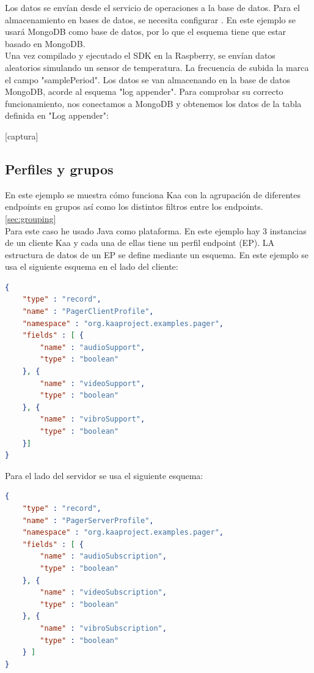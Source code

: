\documentclass[12pt, twoside]{book}
\newcommand{\MYhref}[3][blue]{\href{#2}{\color{#1}{#3}}}
\begin{document}
Los datos se envían desde el  servicio de operaciones a  la base de datos. Para el almacenamiento en bases de datos, se necesita configurar \MYhref{http://kaaproject.github.io/kaa/docs/v0.10.0/Programming-guide/Key-platform-features/Data-collection/MongoDB-log-appender/}{log appender}.  En este ejemplo se usará MongoDB como base de datos, por lo que el esquema  tiene que estar basado en MongoDB. \\

Una vez compilado y ejecutado el SDK en la Raspberry, se envían datos aleatorios simulando un sensor de temperatura. La frecuencia de subida la marca el campo "samplePeriod". Los datos se van almacenando en la base de datos MongoDB, acorde al esquema "log appender". 
Para comprobar su correcto funcionamiento, nos conectamos a MongoDB y obtenemos los datos de la tabla definida en "Log appender":

[captura]
\subsection{Perfiles y grupos}
En este ejemplo se muestra cómo funciona Kaa con la agrupación de diferentes endpoints en grupos así como los distintos filtros entre los endpoints. \ref{sec:grouping} \\

Para este caso he usado Java como plataforma. En este ejemplo hay 3 instancias de un cliente Kaa y cada una de ellas tiene un perfil endpoint (EP). LA estructura de datos de un EP se define mediante un esquema. En este ejemplo se usa el siguiente esquema en el lado del cliente:
\begin{lstlisting}[language=json]
{
 	"type" : "record",
 	"name" : "PagerClientProfile",
	"namespace" : "org.kaaproject.examples.pager",
	"fields" : [ {
		"name" : "audioSupport",
		"type" : "boolean"
  	}, {
		"name" : "videoSupport",
		"type" : "boolean"
	}, {
		"name" : "vibroSupport",
		"type" : "boolean"
	}]
}
\end{lstlisting}
Para el lado del servidor se usa el siguiente esquema:
\begin{lstlisting}[language=json]
{
	"type" : "record",
	"name" : "PagerServerProfile",
	"namespace" : "org.kaaproject.examples.pager",
	"fields" : [ {
		"name" : "audioSubscription",
		"type" : "boolean"
	}, {
		"name" : "videoSubscription",
		"type" : "boolean"
	}, {
		"name" : "vibroSubscription",
		"type" : "boolean"
	} ]
}
\end{lstlisting}
\end{document}
